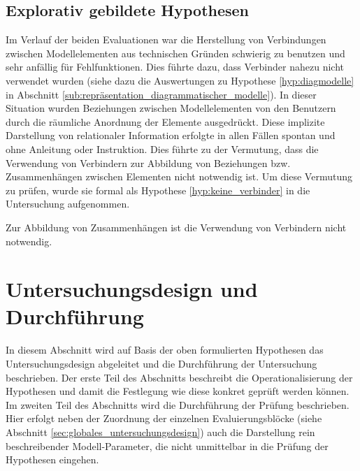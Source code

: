 
\subsection{Explorativ gebildete Hypothesen} %
\label{sub:m_explorativ_gebildete_hypothesen}

Im Verlauf der beiden Evaluationen war die Herstellung von Verbindungen zwischen Modellelementen aus technischen Gründen schwierig zu benutzen und sehr anfällig für Fehlfunktionen. Dies führte dazu, dass Verbinder nahezu nicht verwendet wurden (siehe dazu die Auswertungen zu Hypothese \ref{hyp:diagmodelle} in Abschnitt \ref{sub:repräsentation_diagrammatischer_modelle}). In dieser Situation wurden Beziehungen zwischen Modellelementen von den Benutzern durch die räumliche Anordnung der Elemente ausgedrückt. Diese implizite Darstellung von relationaler Information erfolgte in allen Fällen spontan und ohne Anleitung oder Instruktion. Dies führte zu der Vermutung, dass die Verwendung von Verbindern zur Abbildung von Beziehungen bzw. Zusammenhängen zwischen Elementen nicht notwendig ist. Um diese Vermutung zu prüfen, wurde sie formal als Hypothese \ref{hyp:keine_verbinder} in die Untersuchung aufgenommen.

\begin{hyp}
	\label{hyp:keine_verbinder}
	Zur Abbildung von Zusammenhängen ist die Verwendung von Verbindern nicht notwendig.
\end{hyp}



\section{Untersuchungsdesign und Durchführung} %
\label{sec:m_untersuchungsdesign}

In diesem Abschnitt wird auf Basis der oben formulierten Hypothesen das Untersuchungsdesign abgeleitet und die Durchführung der Untersuchung beschrieben. Der erste Teil des Abschnitts beschreibt die Operationalisierung der Hypothesen und damit die Festlegung wie diese konkret geprüft werden können. Im zweiten Teil des Abschnitts wird die Durchführung der Prüfung beschrieben. Hier erfolgt neben der Zuordnung der einzelnen Evaluierungsblöcke (siehe Abschnitt \ref{sec:globales_untersuchungsdesign}) auch die Darstellung rein beschreibender Modell-Parameter, die nicht unmittelbar in die Prüfung der Hypothesen eingehen. 

